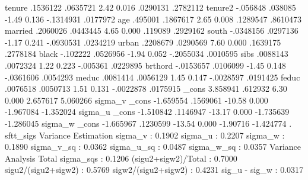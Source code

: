       tenure {\VBAR}   .1536122   .0635721     2.42   0.016     .0290131    .2782112
     tenure2 {\VBAR}   -.056848    .038085    -1.49   0.136    -.1314931    .0177972
         age {\VBAR}    .495001   .1867617     2.65   0.008     .1289547    .8610473
     married {\VBAR}   .2060026   .0443445     4.65   0.000      .119089    .2929162
       south {\VBAR}  -.0348156   .0297136    -1.17   0.241    -.0930531    .0234219
       urban {\VBAR}   .2208679   .0290569     7.60   0.000     .1639175    .2778184
       black {\VBAR}   -.102222   .0526956    -1.94   0.052    -.2055034    .0010595
        sibs {\VBAR}   .0088143   .0072324     1.22   0.223     -.005361    .0229895
     brthord {\VBAR}  -.0153657   .0106099    -1.45   0.148    -.0361606    .0054293
       meduc {\VBAR}   .0081414   .0056129     1.45   0.147    -.0028597    .0191425
       feduc {\VBAR}   .0076518   .0050713     1.51   0.131    -.0022878    .0175915
       _cons {\VBAR}   3.858941    .612932     6.30   0.000     2.657617    5.060266
sigma_v      {\VBAR}
       _cons {\VBAR}  -1.659554   .1569061   -10.58   0.000    -1.967084   -1.352024
sigma_u      {\VBAR}
       _cons {\VBAR}  -1.510842   .1146947   -13.17   0.000    -1.735639   -1.286045
sigma_w      {\VBAR}
       _cons {\VBAR}  -1.665967   .1230599   -13.54   0.000     -1.90716   -1.424774
{\smallskip}
. sftt_sigs
{\smallskip}
               Variance Estimation          
sigma_v    :       0.1902
sigma_u    :       0.2207
sigma_w    :       0.1890
sigma_v_sq :       0.0362
sigma_u_sq :       0.0487
sigma_w_sq :       0.0357
               Variance Analysis          
Total sigma_sqs     :  0.1206
(sigu2+sigw2)/Total :  0.7000
sigu2/(sigu2+sigw2) :  0.5769
sigw2/(sigu2+sigw2) :  0.4231
sig_u - sig_w       :  0.0317
